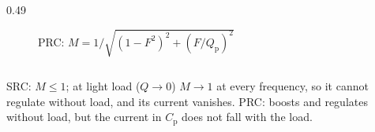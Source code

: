 \begin{frame}
\begin{columns}[T]
\begin{column}{0.49\textwidth}
\begin{figure}
				\caption{PRC: $M=1\big/\sqrt{(1-F^2)^2+(F/Q_\mathrm{p})^2}$}
			\end{figure}
		\end{column}
	\end{columns}
	\vspace{-0.2cm}
	{\small SRC: $M\leq1$; at light load ($Q\to0$) $M\to1$ at every frequency, so it cannot regulate without load, and its current vanishes. PRC: boosts and regulates without load, but the current in $C_\mathrm{p}$ does not fall with the load.}
\end{frame}

